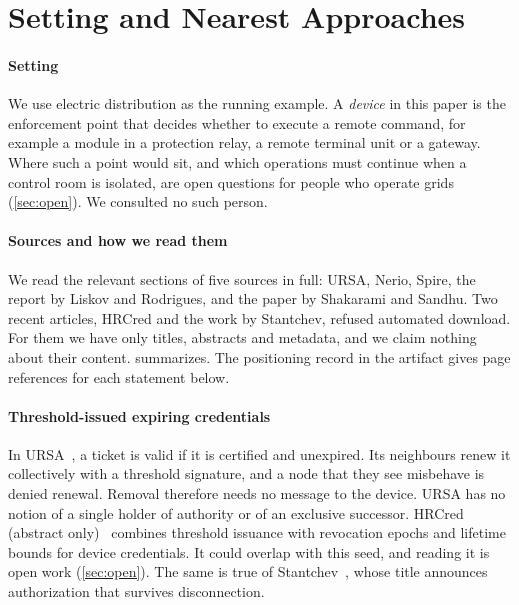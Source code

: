 \section{Setting and Nearest Approaches}
\label{sec:prior}

\paragraph{Setting}
We use electric distribution as the running example. A \emph{device} in this paper is the
enforcement point that decides whether to execute a remote command, for example a module
in a protection relay, a remote terminal unit or a gateway. Where such a point would sit,
and which operations must continue when a control room is isolated, are open questions
for people who operate grids (\cref{sec:open}). We consulted no such person.

\paragraph{Sources and how we read them}
We read the relevant sections of five sources in full: URSA, Nerio, Spire, the report by
Liskov and Rodrigues, and the paper by Shakarami and Sandhu. Two recent articles, HRCred
and the work by Stantchev, refused automated download. For them we have only titles,
abstracts and metadata, and we claim nothing about their content.
 summarizes. The positioning record in the artifact gives page
references for each statement below.

\paragraph{Threshold-issued expiring credentials}
In URSA~\cite{luo2004ursa}, a ticket is valid if it is certified and unexpired. Its
neighbours renew it collectively with a threshold signature, and a node that they see
misbehave is denied renewal. Removal therefore needs no message to the device. URSA has
no notion of a single holder of authority or of an exclusive successor. HRCred
(abstract only)~\cite{zhou2026hrcred} combines threshold issuance with revocation epochs
and lifetime bounds for device credentials. It could overlap with this seed, and reading
it is open work (\cref{sec:open}). The same is true of Stantchev~\cite{stantchev2026survives},
whose title announces authorization that survives disconnection.

